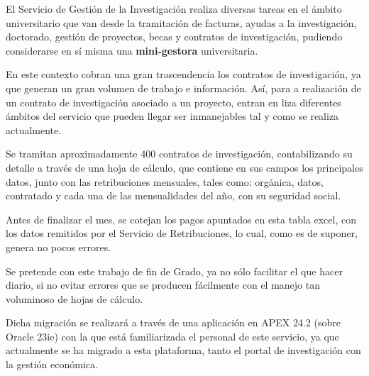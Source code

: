 
El Servicio de Gestión de la Investigación realiza diversas tareas en el ámbito universitario que van desde la tramitación de facturas, ayudas a la investigación, doctorado, gestión de proyectos, becas y contratos de investigación, pudiendo considerarse en sí misma una \textbf{mini-gestora}   universitaria.

En este contexto cobran una gran trascendencia los contratos de investigación, ya que generan un gran volumen de trabajo e información. Así, para a realización de un contrato de investigación asociado a un proyecto, entran en liza diferentes ámbitos del servicio que pueden llegar ser inmanejables tal y como se realiza actualmente.

Se tramitan aproximadamente 400 contratos de investigación, contabilizando su detalle a través de una hoja de cálculo, que contiene en sus campos los principales datos, junto con las retribuciones mensuales, tales como: orgánica, datos, contratado y cada una de las mensualidades del año, con su seguridad social.

Antes de finalizar el mes, se cotejan los pagos apuntados en esta tabla excel, con los datos remitidos por el Servicio de Retribuciones, lo cual, como es de suponer, genera no pocos errores.

Se pretende con este trabajo de fin de Grado, ya no sólo facilitar el que hacer diario, si no evitar errores que se producen fácilmente con el manejo tan voluminoso de hojas de cálculo.

Dicha migración se realizará a través de una aplicación en \acrfull{APEX} 24.2 (sobre Oracle 23ie) con la que está familiarizada el personal de este servicio, ya que actualmente se ha migrado a esta plataforma, tanto el portal de investigación con la gestión económica.
